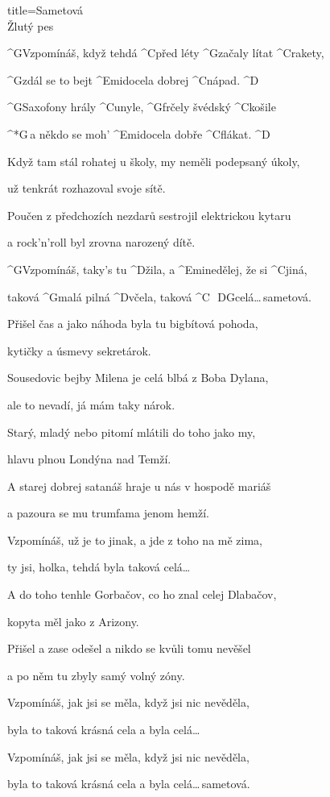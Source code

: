 \begin{song}{title=\predtitle\centering Sametová \\\large Žlutý pes  \vspace*{-0.3cm}}  %
\begin{centerjustified}

\sloka 
	^{G\z}Vzpomínáš, když tehdá ^{C\z}před léty ^{G\z}začaly lítat ^{C\z}rakety,

	^{G\z}zdál se to bejt ^{Emi\z}docela dobrej ^{C\z}nápad. ^{D}

	^{G\z}Saxofony hrály ^{C\z}unyle, ^{G\z}frčely švédský ^{C\z}košile

	^*{G\,}a\: někdo se moh' ^{Emi\z}docela dobře ^{C\z}flákat. ^{D}
	
\sloka
	 Když tam stál rohatej u školy, my neměli podepsaný úkoly,

	už tenkrát rozhazoval svoje sítě.

	Poučen z předchozích nezdarů sestrojil elektrickou kytaru  
	
	a rock'n'roll byl zrovna narozený dítě.
	
	^{G\z}Vzpomínáš, taky's tu ^{D\z}žila, a ^{Emi\z}nedělej, že si ^{C}jiná,

	taková ^{G\z}malá pilná ^{D\z}včela, taková ^{C\,\,\,\,D\phantom{ddddd}G\phantom{d}}celá\elipsa\dots\,sametová.
	
	
\sloka
	Přišel čas a jako náhoda byla tu bigbítová pohoda,
	
	kytičky a úsmevy sekretárok.
	
	Sousedovic bejby Milena je celá blbá z Boba Dylana,
	
	ale to nevadí, já mám taky nárok.

\sloka
	Starý, mladý nebo pitomí mlátili do toho jako my,
	
	hlavu plnou Londýna nad Temží.
	
	A starej dobrej satanáš hraje u nás v hospodě mariáš
	
	a pazoura se mu trumfama jenom hemží.

	Vzpomínáš, už je to jinak, a jde z toho na mě zima,
	
	ty jsi, holka, tehdá byla taková celá\elipsa\dots\,	
	
\sloka
	A do toho tenhle Gorbačov, co ho znal celej Dlabačov,
	
	kopyta měl jako z Arizony.
	
	Přišel a zase odešel a nikdo se kvůli tomu nevěšel
	
	a po něm tu zbyly samý volný zóny.

	Vzpomínáš, jak jsi se měla, když jsi nic nevěděla,
	
	byla to taková krásná cela a byla celá\elipsa\dots\,
	 
	Vzpomínáš, jak jsi se měla, když jsi nic nevěděla,
	
	byla to taková krásná cela a byla celá\elipsa\dots\,sametová.

\end{centerjustified}
\setcounter{Slokočet}{0}
\end{song}
